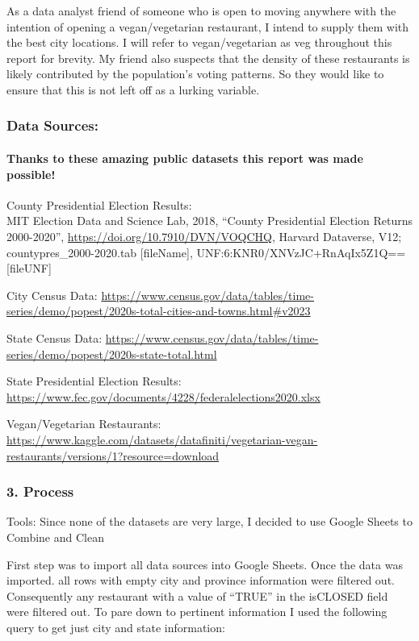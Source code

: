 \documentclass[
]{article}
\begin{document}
As a data analyst friend of someone who is open to moving anywhere with
the intention of opening a vegan/vegetarian restaurant, I intend to
supply them with the best city locations. I will refer to
vegan/vegetarian as veg throughout this report for brevity. My friend
also suspects that the density of these restaurants is likely
contributed by the population's voting patterns. So they would like to
ensure that this is not left off as a lurking variable.

\subsubsection{Data Sources:}\label{data-sources}

\paragraph{Thanks to these amazing public datasets this report was made
possible!}\label{thanks-to-these-amazing-public-datasets-this-report-was-made-possible}

County Presidential Election Results:\\
MIT Election Data and Science Lab, 2018, ``County Presidential Election
Returns 2000-2020'', \url{https://doi.org/10.7910/DVN/VOQCHQ}, Harvard
Dataverse, V12; countypres\_2000-2020.tab {[}fileName{]},
UNF:6:KNR0/XNVzJC+RnAqIx5Z1Q== {[}fileUNF{]}

City Census Data:
\url{https://www.census.gov/data/tables/time-series/demo/popest/2020s-total-cities-and-towns.html\#v2023}

State Census Data:
\url{https://www.census.gov/data/tables/time-series/demo/popest/2020s-state-total.html}

State Presidential Election Results:
\url{https://www.fec.gov/documents/4228/federalelections2020.xlsx}

Vegan/Vegetarian Restaurants:
\url{https://www.kaggle.com/datasets/datafiniti/vegetarian-vegan-restaurants/versions/1?resource=download}

\subsubsection{3. Process}\label{process}

Tools: Since none of the datasets are very large, I decided to use
Google Sheets to Combine and Clean

First step was to import all data sources into Google Sheets. Once the
data was imported. all rows with empty city and province information
were filtered out. Consequently any restaurant with a value of ``TRUE''
in the isCLOSED field were filtered out. To pare down to pertinent
information I used the following query to get just city and state
information:
\end{document}

